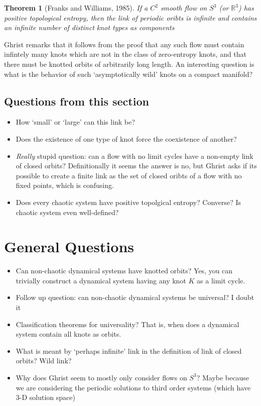 \documentclass[11pt]{article}
\newcommand{\R}{\mathbb{R}}
\theoremstyle{plain}
\newtheorem{thm}{Theorem}
\theoremstyle{definition}
\begin{document}
\begin{thm}[Franks and Williams, 1985]
  If a $C^2$ smooth flow on $S^3$ (or $\R^3$) has positive topological entropy, then the link of periodic oribts is infinite and contains an infinite number of distinct knot types as components
\end{thm}

Ghrist remarks that it follows from the proof that any such flow must contain infintely many knots which are not in the class of zero-entropy knots, and that there must be knotted orbits of arbitrarily long length. An interesting
question is what is the behavior of such `asymptotically wild' knots on a compact manifold?



\subsection{Questions from this section}
\begin{itemize}
\item How `small' or `large' can this link be?
\item Does the existence of one type of knot force the coexistence of another?
\item \emph{Really} stupid question: can a flow with no limit cycles have a non-empty link of closed orbits? Definitionally it seems the answer is no, but Ghrist asks if its possible to create a finite link as the set of
closed oribts of a flow with no fixed points, which is confusing.
\item Does every chaotic system have positive topolgical entropy? Converse? Is chaotic system even well-defined?
\end{itemize}


\section{General Questions}

\begin{itemize}
    \item Can non-chaotic dynamical systems have knotted orbits? Yes, you can trivially construct a dynamical system having any knot $K$ as a limit cycle.
    \item Follow up question: can non-chaotic dynamical systems be universal? I doubt it
    \item Classification theorems for universality? That is, when does a dynamical system contain all knots as orbits.
    \item What is meant by `perhaps infinite' link in the definition of link of closed orbits? Wild link?
    \item Why does Ghrist seem to mostly only consider flows on $S^3$? Maybe because we are considering the periodic solutions to third order systems (which have 3-D solution space)
\end{itemize}
\end{document}
